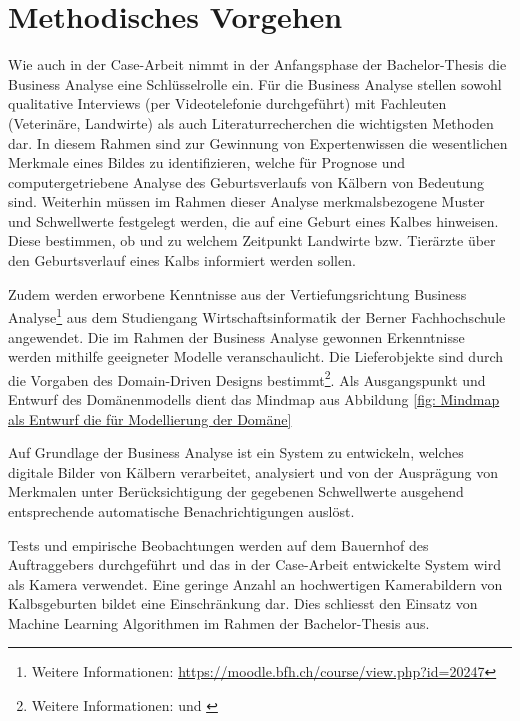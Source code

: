 \chapter{Methodisches Vorgehen}

Wie auch in der Case-Arbeit nimmt in der Anfangsphase der Bachelor-Thesis die Business Analyse eine Schlüsselrolle ein. Für die Business Analyse stellen sowohl qualitative Interviews (per Videotelefonie durchgeführt) mit Fachleuten (Veterinäre, Landwirte) als auch Literaturrecherchen die wichtigsten Methoden dar. In diesem Rahmen sind zur Gewinnung von Expertenwissen die wesentlichen Merkmale eines Bildes zu identifizieren, welche für Prognose und computergetriebene Analyse des Geburtsverlaufs von Kälbern von Bedeutung sind.  Weiterhin müssen im Rahmen dieser Analyse merkmalsbezogene Muster und Schwellwerte festgelegt werden, die auf eine Geburt eines Kalbes hinweisen. Diese bestimmen, ob und zu welchem Zeitpunkt Landwirte bzw. Tierärzte über den Geburtsverlauf eines Kalbs informiert werden sollen. 

Zudem werden erworbene Kenntnisse aus der Vertiefungsrichtung Business Analyse\footnote{Weitere Informationen: \url{https://moodle.bfh.ch/course/view.php?id=20247}} aus dem Studiengang Wirtschaftsinformatik der Berner Fachhochschule angewendet.  Die im Rahmen der Business Analyse gewonnen Erkenntnisse werden mithilfe geeigneter Modelle veranschaulicht. Die Lieferobjekte sind durch die Vorgaben des Domain-Driven Designs bestimmt\footnote{Weitere Informationen: \citep{Evans2015} und \citep{Vernon2016}}. Als Ausgangspunkt und Entwurf des Domänenmodells dient das Mindmap aus Abbildung \ref{fig: Mindmap als Entwurf die für Modellierung der Domäne}

Auf Grundlage der Business Analyse ist ein System zu entwickeln, welches digitale Bilder von Kälbern verarbeitet, analysiert und von der Ausprägung von Merkmalen unter Berücksichtigung der gegebenen Schwellwerte ausgehend entsprechende automatische Benachrichtigungen auslöst. 

Tests und empirische Beobachtungen werden auf dem Bauernhof des Auftraggebers durchgeführt und das in der Case-Arbeit entwickelte System wird als Kamera verwendet. Eine geringe Anzahl an hochwertigen Kamerabildern von Kalbsgeburten bildet eine Einschränkung dar. Dies schliesst den Einsatz von Machine Learning Algorithmen im Rahmen der Bachelor-Thesis aus.

